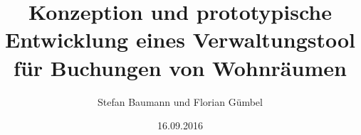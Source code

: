 \documentclass[12pt,fleqn]{book} %
\begin{document}
\newcommand{\ourBookTitle}{Konzeption und prototypische Entwicklung eines Verwaltungstool für Buchungen von Wohnräumen}
\title{\ourBookTitle}
\author{Stefan Baumann und Florian Gümbel}
\newcommand{\ourSubTitle}{Analyse der Verteilten Anwendung }
\newcommand{\ourBookDate}{16.09.2016}
\date{\ourBookDate}
\maketitle
\newpage
\thispagestyle{empty}
\mbox{}

\pagebreak
\pagestyle{roman}
\setcounter{page}{3}

\pagebreak

\newpage
\newpage
{
\tableofcontents
\raggedbottom
\pagebreak}

\pagestyle{fancyStd}









\pagebreak
{\listoffigures
\raggedbottom
\pagebreak}
{\lstlistoflistings
\raggedbottom
\pagebreak}
\printbibliography
\glsaddall
\printglossary[nonumberlist]
\end{document}
